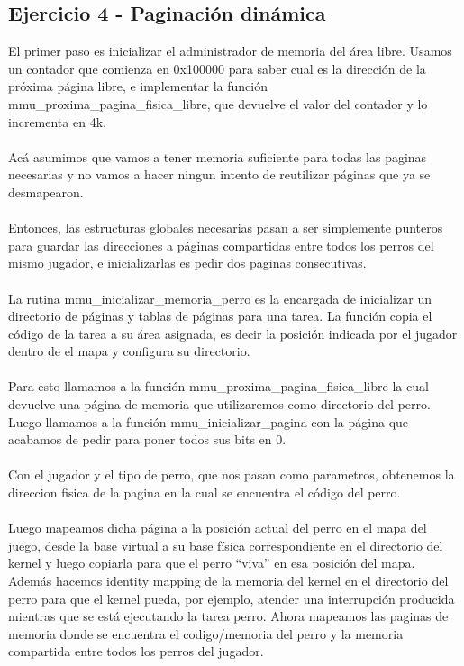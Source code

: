 \documentclass[10pt,a4paper,spanish]{article}
\begin{document}
\subsection{Ejercicio 4 - Paginación dinámica}
El primer paso es inicializar el administrador de memoria del área libre. Usamos un contador que comienza en 0x100000 para saber cual es la dirección de la próxima página libre, e implementar la función mmu\_proxima\_pagina\_fisica\_libre, que devuelve el valor del contador y lo incrementa en 4k.
\\ \\
Acá asumimos que vamos a tener memoria suficiente para todas las paginas necesarias y no vamos a hacer ningun intento de reutilizar páginas que ya se desmapearon.
\\ \\
Entonces, las estructuras globales necesarias pasan a ser simplemente punteros para guardar las direcciones a páginas compartidas entre todos los perros del mismo jugador, e inicializarlas es pedir dos paginas consecutivas.
\\ \\
La  rutina mmu\_inicializar\_memoria\_perro es la encargada de inicializar un directorio de páginas y tablas de páginas para una tarea. La función copia el código de la tarea a su área asignada, es decir la posición indicada por el jugador dentro de el mapa y configura su directorio.
\\ \\
Para esto llamamos a la función mmu\_proxima\_pagina\_fisica\_libre la cual devuelve una página de memoria que utilizaremos como directorio del perro. Luego llamamos a la función mmu\_inicializar\_pagina con la página que acabamos de pedir para poner todos sus bits en 0.
\\ \\
Con el jugador y el tipo de perro, que nos pasan como parametros, obtenemos la direccion fisica de la pagina en la cual se encuentra el código del perro.
\\ \\
Luego mapeamos dicha página a la posición actual del perro en el mapa del juego, desde la base virtual a su base física correspondiente en el directorio del kernel y luego copiarla para que el perro “viva” en esa posición del mapa.
Además hacemos identity mapping de la memoria del kernel en el directorio del perro para que el kernel pueda, por ejemplo, atender una interrupción producida mientras que se está ejecutando la tarea perro.
Ahora mapeamos las paginas de memoria donde se encuentra el codigo/memoria del perro y la memoria compartida entre todos los perros del jugador.
\end{document}

